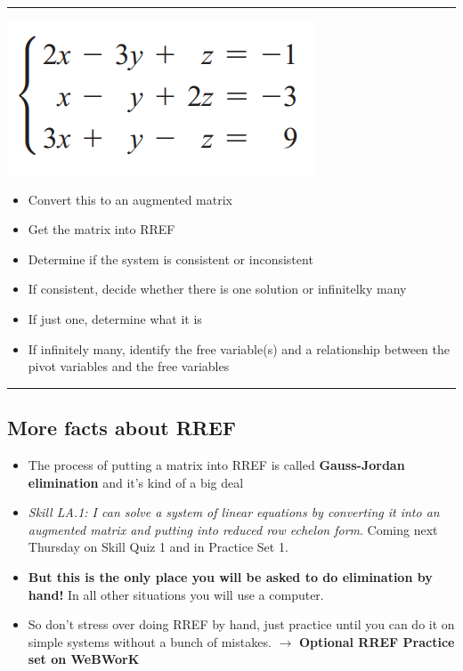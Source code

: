\documentclass[
  letterpaper,
  DIV=11,
  numbers=noendperiod]{scrartcl}
\providecommand{\tightlist}{%
  \setlength{\itemsep}{0pt}\setlength{\parskip}{0pt}}\usepackage{longtable,booktabs,array}
\begin{document}
\begin{center}\rule{0.5\linewidth}{0.5pt}\end{center}

\includegraphics{system.png}

\begin{itemize}
\tightlist
\item
  Convert this to an augmented matrix
\item
  Get the matrix into RREF
\item
  Determine if the system is consistent or inconsistent
\item
  If consistent, decide whether there is one solution or infinitelky
  many
\item
  If just one, determine what it is
\item
  If infinitely many, identify the free variable(s) and a relationship
  between the pivot variables and the free variables
\end{itemize}

\begin{center}\rule{0.5\linewidth}{0.5pt}\end{center}

\hypertarget{more-facts-about-rref}{%
\subsection{More facts about RREF}\label{more-facts-about-rref}}

\begin{itemize}
\tightlist
\item
  The process of putting a matrix into RREF is called
  \textbf{Gauss-Jordan elimination} and it's kind of a big deal
\item
  \emph{Skill LA.1: I can solve a system of linear equations by
  converting it into an augmented matrix and putting into reduced row
  echelon form}. Coming next Thursday on Skill Quiz 1 and in Practice
  Set 1.
\item
  \textbf{But this is the only place you will be asked to do elimination
  by hand!} In all other situations you will use a computer.
\item
  So don't stress over doing RREF by hand, just practice until you can
  do it on simple systems without a bunch of mistakes. \(\rightarrow\)
  \textbf{Optional RREF Practice set on WeBWorK}
\end{itemize}
\end{document}
